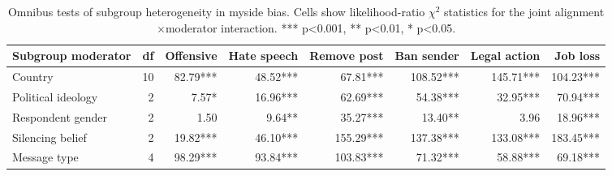 \begin{table}

\caption{\label{tab:robustness-omnibus-subgroup}Omnibus tests of subgroup heterogeneity in myside bias. Cells show likelihood-ratio $\chi^2$ statistics for the joint alignment$\times$moderator interaction. *** p<0.001, ** p<0.01, * p<0.05.}
\centering
\begin{tabular}[t]{lrrrrrrr}
\toprule
\textbf{Subgroup moderator} & \textbf{df} & \textbf{Offensive} & \textbf{Hate speech} & \textbf{Remove post} & \textbf{Ban sender} & \textbf{Legal action} & \textbf{Job loss}\\
\midrule
Country & 10 & 82.79*** & 48.52*** & 67.81*** & 108.52*** & 145.71*** & 104.23***\\
Political ideology & 2 & 7.57* & 16.96*** & 62.69*** & 54.38*** & 32.95*** & 70.94***\\
Respondent gender & 2 & 1.50 & 9.64** & 35.27*** & 13.40** & 3.96 & 18.96***\\
Silencing belief & 2 & 19.82*** & 46.10*** & 155.29*** & 137.38*** & 133.08*** & 183.45***\\
Message type & 4 & 98.29*** & 93.84*** & 103.83*** & 71.32*** & 58.88*** & 69.18***\\
\bottomrule
\end{tabular}
\end{table}
